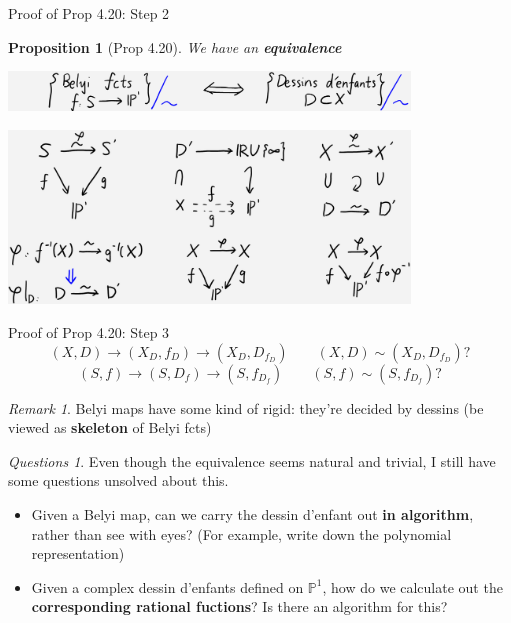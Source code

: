 \documentclass[pdf]{beamer}
\numberwithin{equation}{section}
\theoremstyle{plain}
\newtheorem{proposition}[theorem]{Proposition}
\theoremstyle{plain}
\theoremstyle{remark}
\newtheorem{remark}[theorem]{Remark}
\newtheorem{question}[theorem]{Questions}
\begin{document}
\begin{frame}{Proof of Prop 4.20: Step 2}
\begin{proposition}[Prop 4.20]
	We have an \textbf{equivalence}
	\begin{center}
		\includegraphics[width=0.8\textwidth]{figures/equivalence2.png}
	\end{center}
	\begin{center}
	\includegraphics[width=0.8\textwidth]{figures/compatability.png}
\end{center}
\end{proposition}

\end{frame}
\begin{frame}{Proof of Prop 4.20: Step 3}
	$$(X,D) \rightarrow (X_D,f_D) \rightarrow (X_D,D_{f_D}) \qquad (X,D) \sim (X_D,D_{f_D})?$$
	$$(S,f) \rightarrow (S,D_f) \rightarrow (S,f_{D_f}) \qquad (S,f) \sim (S,f_{D_f})?$$
\end{frame}
\begin{frame}
\begin{remark}
	Belyi maps have some kind of rigid: they're decided by dessins (be viewed as \textbf{skeleton} of Belyi fcts)
\end{remark}
\begin{question}
	Even though the equivalence seems natural and trivial, I still have some questions unsolved about this.
\begin{itemize}
	\item Given a Belyi map, can we carry the dessin d'enfant out \textbf{in algorithm}, rather than see with eyes? (For example, write down the polynomial representation)
	\item Given a complex dessin d'enfants defined on $\mathbb{P}^1$, how do we calculate out the \textbf{corresponding rational fuctions}? Is there an algorithm for this?
\end{itemize}
\end{question}
\end{frame}
\end{document}
